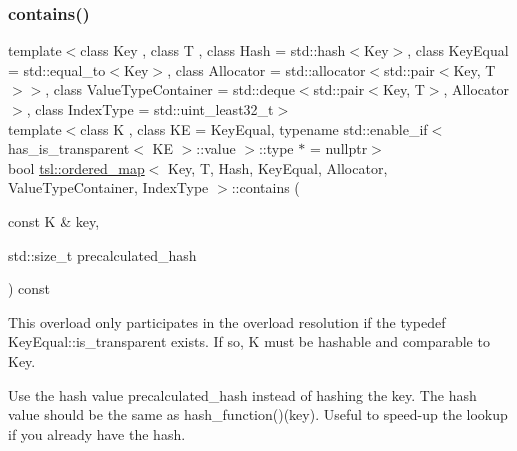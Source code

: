 \subsubsection{\texorpdfstring{contains()}{contains()}\hspace{0.1cm}{\footnotesize\ttfamily [3/3]}}
{\footnotesize\ttfamily template$<$class Key , class T , class Hash  = std\+::hash$<$\+Key$>$, class Key\+Equal  = std\+::equal\+\_\+to$<$\+Key$>$, class Allocator  = std\+::allocator$<$std\+::pair$<$\+Key, T$>$$>$, class Value\+Type\+Container  = std\+::deque$<$std\+::pair$<$\+Key, T$>$, Allocator$>$, class Index\+Type  = std\+::uint\+\_\+least32\+\_\+t$>$ \\
template$<$class K , class KE  = Key\+Equal, typename std\+::enable\+\_\+if$<$ has\+\_\+is\+\_\+transparent$<$ K\+E $>$\+::value $>$\+::type $\ast$  = nullptr$>$ \\
bool \mbox{\hyperlink{classtsl_1_1ordered__map}{tsl\+::ordered\+\_\+map}}$<$ Key, T, Hash, Key\+Equal, Allocator, Value\+Type\+Container, Index\+Type $>$\+::contains (\begin{DoxyParamCaption}\item[{const K \&}]{key,  }\item[{std\+::size\+\_\+t}]{precalculated\+\_\+hash }\end{DoxyParamCaption}) const\hspace{0.3cm}{\ttfamily [inline]}}





This overload only participates in the overload resolution if the typedef Key\+Equal\+::is\+\_\+transparent exists. If so, K must be hashable and comparable to Key.

Use the hash value \textquotesingle{}precalculated\+\_\+hash\textquotesingle{} instead of hashing the key. The hash value should be the same as hash\+\_\+function()(key). Useful to speed-\/up the lookup if you already have the hash. \mbox{\label{classtsl_1_1ordered__map_a85c73fa60dbccb5f638892ee0b745566}} 
